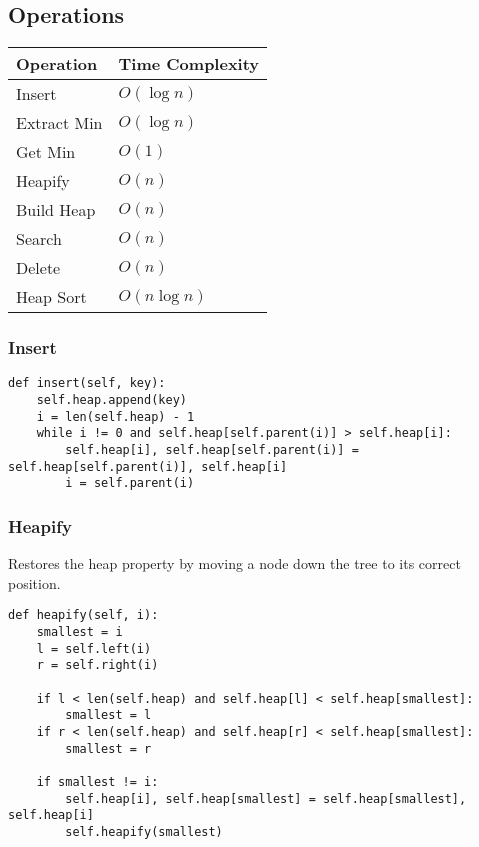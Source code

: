 \subsection{Operations}
\begin{summary}
    \begin{center}
        \begin{tabular}{ll}
            \toprule
            \textbf{Operation} & \textbf{Time Complexity} \\
            \midrule
            Insert & $O(\log n)$ \\
            \midrule
            Extract Min & $O(\log n)$ \\
            \midrule
            Get Min & $O(1)$ \\
            \midrule
            Heapify & $O(n)$ \\
            \midrule
            Build Heap & $O(n)$ \\
            \midrule
            Search & $O(n)$ \\
            \midrule
            Delete & $O(n)$ \\
            \midrule
            Heap Sort & $O(n \log n)$ \\
        \end{tabular}
    \end{center}
\end{summary}

\subsubsection{Insert}
\begin{algo}
\begin{lstlisting}
def insert(self, key):
    self.heap.append(key)
    i = len(self.heap) - 1
    while i != 0 and self.heap[self.parent(i)] > self.heap[i]:
        self.heap[i], self.heap[self.parent(i)] = self.heap[self.parent(i)], self.heap[i]
        i = self.parent(i)
\end{lstlisting}
\end{algo}

\subsubsection{Heapify}
\begin{algo} Restores the heap property by moving a node down the tree to its correct position. 
\begin{lstlisting}
def heapify(self, i):
    smallest = i
    l = self.left(i)
    r = self.right(i)

    if l < len(self.heap) and self.heap[l] < self.heap[smallest]:
        smallest = l
    if r < len(self.heap) and self.heap[r] < self.heap[smallest]:
        smallest = r

    if smallest != i:
        self.heap[i], self.heap[smallest] = self.heap[smallest], self.heap[i]
        self.heapify(smallest)
\end{lstlisting}
\end{algo}

